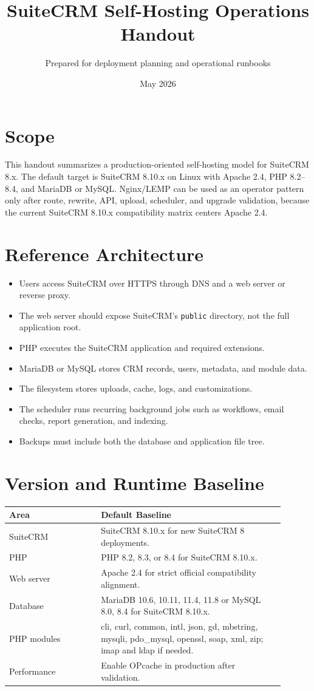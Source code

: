 \documentclass[11pt]{article}
\title{SuiteCRM Self-Hosting Operations Handout}
\author{Prepared for deployment planning and operational runbooks}
\date{May 2026}
\begin{document}
\maketitle

\section*{Scope}
This handout summarizes a production-oriented self-hosting model for SuiteCRM 8.x. The default target is SuiteCRM 8.10.x on Linux with Apache 2.4, PHP 8.2--8.4, and MariaDB or MySQL. Nginx/LEMP can be used as an operator pattern only after route, rewrite, API, upload, scheduler, and upgrade validation, because the current SuiteCRM 8.10.x compatibility matrix centers Apache 2.4.

\section{Reference Architecture}
\begin{itemize}
  \item Users access SuiteCRM over HTTPS through DNS and a web server or reverse proxy.
  \item The web server should expose SuiteCRM's \texttt{public} directory, not the full application root.
  \item PHP executes the SuiteCRM application and required extensions.
  \item MariaDB or MySQL stores CRM records, users, metadata, and module data.
  \item The filesystem stores uploads, cache, logs, and customizations.
  \item The scheduler runs recurring background jobs such as workflows, email checks, report generation, and indexing.
  \item Backups must include both the database and application file tree.
\end{itemize}

\section{Version and Runtime Baseline}
\begin{longtable}{L{0.30\linewidth} L{0.60\linewidth}}
\textbf{Area} & \textbf{Default Baseline} \\
\hline
SuiteCRM & SuiteCRM 8.10.x for new SuiteCRM 8 deployments. \\
PHP & PHP 8.2, 8.3, or 8.4 for SuiteCRM 8.10.x. \\
Web server & Apache 2.4 for strict official compatibility alignment. \\
Database & MariaDB 10.6, 10.11, 11.4, 11.8 or MySQL 8.0, 8.4 for SuiteCRM 8.10.x. \\
PHP modules & cli, curl, common, intl, json, gd, mbstring, mysqli, pdo\_mysql, openssl, soap, xml, zip; imap and ldap if needed. \\
Performance & Enable OPcache in production after validation. \\
\end{longtable}
\end{document}
